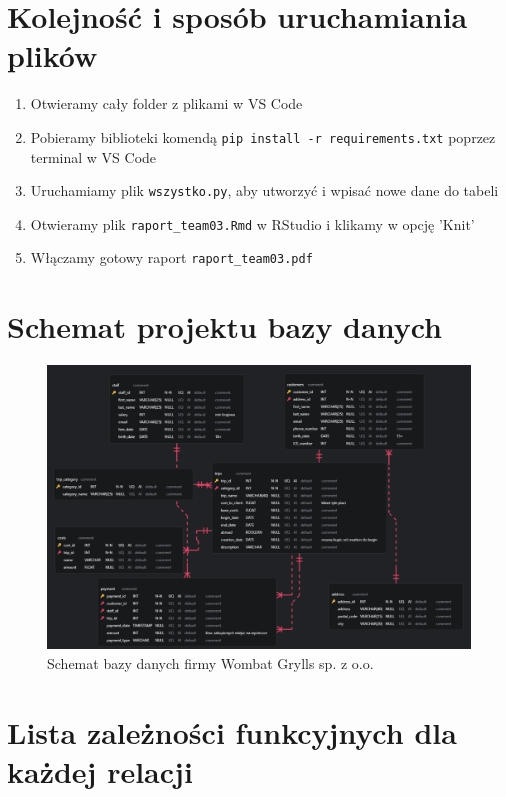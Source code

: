 \documentclass{article}
\begin{document}
\section{Kolejność i sposób uruchamiania plików}
\begin{enumerate}
    \item Otwieramy cały folder z plikami w VS Code \\
	\item Pobieramy biblioteki komendą \texttt{pip install -r requirements.txt} poprzez terminal w VS Code \\
	\item Uruchamiamy plik \texttt{wszystko.py}, aby utworzyć i wpisać nowe dane do tabeli \\
	\item Otwieramy plik \texttt{raport\_team03.Rmd} w RStudio i klikamy w opcję 'Knit' \\
	\item Włączamy gotowy raport \texttt{raport\_team03.pdf}
\end{enumerate}

\section{Schemat projektu bazy danych}
\begin{figure}[h!]
\centering
\includegraphics[width=\textwidth]{schemat_bazy.png}  %
\caption{Schemat bazy danych firmy Wombat Grylls sp. z o.o.}
\end{figure}

\newpage

\section{Lista zależności funkcyjnych dla każdej relacji}
\end{document}
